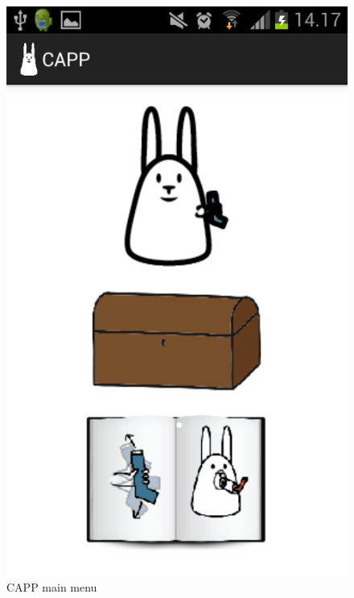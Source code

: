 \begin{figure}[H]
\begin{minipage}[b]{0.3\linewidth}
			\includegraphics[width=0.20\paperwidth]{Pictures/app-screenshots/capp_main_menu.png}
		\caption{CAPP main menu}
		\label{fig:capp-main-menu}
	\end{minipage} 
\end{figure}

